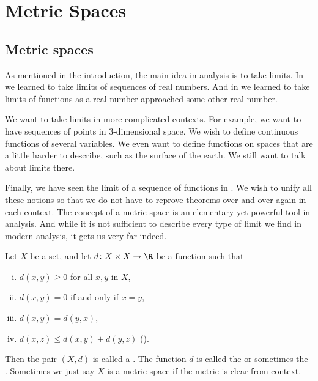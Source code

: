 \documentclass[12pt]{book}
\begin{document}

\chapter{Metric Spaces} \label{ms:chapter}


\section{Metric spaces}
\label{sec:metric}


As mentioned in the introduction, the main idea in analysis is to take
limits.
In  we learned to take limits of sequences of
real numbers.
And in  we learned to take limits
of functions as a real number approached some other real number.

We want to take limits in more complicated contexts.
For
example, we want to have sequences of points in 3-dimensional space.
We wish to define continuous functions of several variables.
We even want to define functions on spaces that are a little harder to
describe, such as the surface of the earth.
We still want to talk about
limits there.

Finally, we have seen the limit of a sequence of
functions in .
We wish to unify all these notions so that we do not have to
reprove theorems over and over again in each context.
The concept of a
metric space is an elementary yet powerful tool in analysis.
And while it
is not sufficient to describe every type of limit we find in modern
analysis, it gets us very far indeed.

\begin{defn}
Let $X$ be a set, and let
$d \colon X \times X \to \R$
be a function such that
\begin{enumerate}[(i)]
\item \label{metric:pos} $d(x,y) \geq 0$ for all $x, y$ in $X$,
\item \label{metric:zero} $d(x,y) = 0$ if and only if $x = y$,
\item \label{metric:com} $d(x,y) = d(y,x)$, 
\item \label{metric:triang} $d(x,z) \leq d(x,y)+ d(y,z)$ \qquad (\emph{}).
\end{enumerate}
Then the pair $(X,d)$ is called a \emph{}.
The
function $d$ is called the \emph{} or sometimes the
\emph{}.
Sometimes we just say $X$ is a metric space if the metric is clear from
context.
\end{defn}
\end{document}
